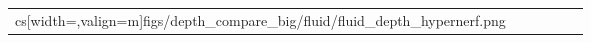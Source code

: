 \begin{table}
\begin{center}
\begin{tabular}{ @{}rC@{\hskip 3pt}C@{\hskip 3pt}C@{\hskip 3pt}C@{\hskip 3pt}C@{} }
cs[width=\linewidth,valign=m]{figs/depth_compare_big/fluid/fluid_depth_hypernerf.png}  \\


\end{tabular}
\end{center}
\end{table}
